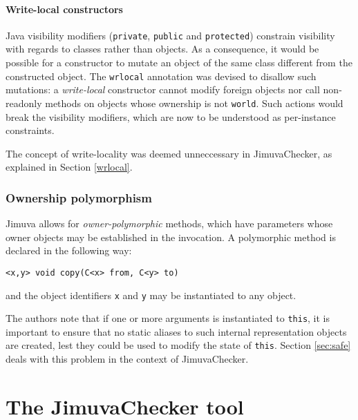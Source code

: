 \documentclass{pracamgr}
\begin{document}
\subsubsection{Write-local constructors}

Java visibility modifiers (\texttt{private}, \texttt{public} and
\texttt{protected}) constrain visibility with regards to classes
rather than objects. As a consequence, it would be possible for a
constructor to mutate an object of the same class different from the
constructed object. The \texttt{wrlocal} annotation was devised to
disallow such mutations: a \emph{write-local} constructor cannot
modify foreign objects nor call non-readonly methods on objects whose
ownership is not \texttt{world}. Such actions would break the
visibility modifiers, which are now to be understood as per-instance
constraints.

The concept of write-locality was deemed unneccessary in
JimuvaChecker, as explained in Section \ref{wrlocal}.

\subsection{Ownership polymorphism}

Jimuva allows for \emph{owner-polymorphic} methods, which have
parameters whose owner objects may be established in the invocation. A
polymorphic method is declared in the following way:
\begin{center}
  \texttt{<x,y> void copy(C<x> from, C<y> to)}
\end{center}
and the object identifiers \texttt{x} and \texttt{y} may be
instantiated to any object.

The authors note that if one or more arguments is instantiated to
\texttt{this}, it is important to ensure that no static aliases to
such internal representation objects are created, lest they could be
used to modify the state of \texttt{this}. Section \ref{sec:safe}
deals with this problem in the context of JimuvaChecker.

\chapter{The JimuvaChecker tool}
\end{document}
